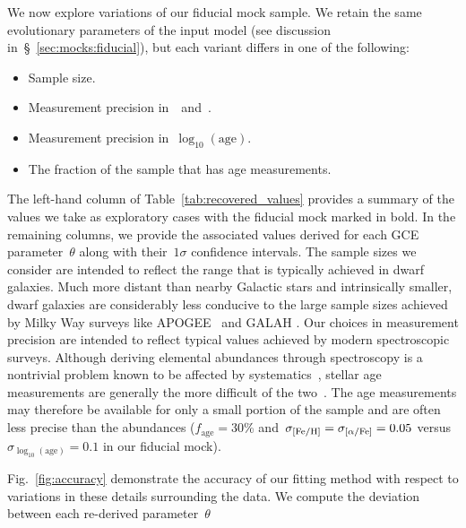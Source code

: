 \documentclass[ms.tex]{subfiles}
\begin{document}
We now explore variations of our fiducial mock sample.
We retain the same evolutionary parameters of the input model (see discussion
in~\S~\ref{sec:mocks:fiducial}), but each variant differs in one of the
following:
\begin{itemize}

	\item Sample size.

	\item Measurement precision in~\feh~and~\afe.

	\item Measurement precision in~$\log_{10}(\text{age})$.

	\item The fraction of the sample that has age measurements.

\end{itemize}
The left-hand column of Table~\ref{tab:recovered_values} provides a summary of
the values we take as exploratory cases with the fiducial mock marked in bold.
In the remaining columns, we provide the associated values derived for each
GCE parameter~$\theta$ along with their~$1\sigma$ confidence intervals.
The sample sizes we consider are intended to reflect the range that is
typically achieved in dwarf galaxies.
Much more distant than nearby Galactic stars and intrinsically smaller, dwarf
galaxies are considerably less conducive to the large sample sizes achieved by
Milky Way surveys like APOGEE~\citep{Majewski2017} and GALAH
\citep{DeSilva2015, Martell2017}.
Our choices in measurement precision are intended to reflect typical values
achieved by modern spectroscopic surveys.
Although deriving elemental abundances through spectroscopy is a nontrivial
problem known to be affected by systematics~\citep[e.g.][]{Anguino2018},
stellar age measurements
are generally the more difficult of the two~\citep{Soderblom2010, Chaplin2013}.
The age measurements may therefore be available for only a small portion of the
sample and are often less precise than the abundances ($f_\text{age} = 30$\%
and~$\sigma_{\text{[Fe/H]}} = \sigma_{\text{[$\alpha$/Fe]}} = 0.05$ versus
$\sigma_{\log_{10}(\text{age})} = 0.1$ in our fiducial mock).
\par
Fig.~\ref{fig:accuracy} demonstrate the accuracy of our fitting method with
respect to variations in these details surrounding the data.
We compute the deviation between each re-derived parameter~$\theta$
\end{document}

